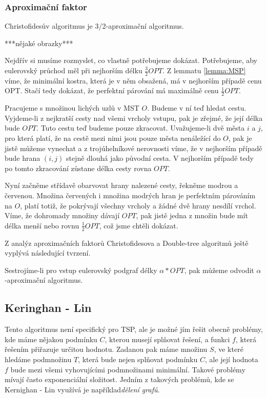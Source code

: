 \documentclass[
  biblatex,
  figures=false,
  glossaries,
  index
]{kidiplom}
\begin{document}
\subsubsection{Aproximační faktor}
\begin{theorem}
	Christofidesův algoritmus  je 3/2-aproximační algoritmus.
\end{theorem}
***nějaké obrazky***

	Nejdřív si musíme rozmyslet, co vlastně potřebujeme dokázat. Potřebujeme, aby eulerovský průchod měl při nejhorším délku $\frac{3}{2}OPT$. Z lemmatu \ref{lemma:MSP} víme, že minimální kostra, která je v něm obsažená, má v nejhorším případě cenu OPT. Stačí tedy dokázat, že perfektní párování má maximálně cenu $\frac{1}{2} OPT$.
	
	Pracujeme s množinou lichých uzlů v MST $O$. Budeme v ní teď hledat cestu. Vyjdeme-li z nejkratší cesty nad všemi vrcholy vstupu, pak je zřejmé, že její délka bude $OPT$. Tuto cestu teď budeme pouze zkracovat. Uvažujeme-li dvě města $i$ a $j$, pro která platí, že na cestě mezi nimi jsou pouze města nenáležící do $O$, pak je jistě můžeme vynechat a z trojúhelníkové nerovnosti víme, že v nejhorším případě bude hrana $(i,j)$ stejně dlouhá jako původní cesta. V nejhorším případě tedy po tomto zkracování zůstane délka cesty rovna $OPT$.
	
	Nyní začněme střídavě obarvovat hrany nalezené cesty, řekněme modrou a červenou. Množina červených i množina modrých hran je perfektním párováním na $O$, platí totiž, že pokrývají všechny vrcholy a žádné dvě hrany nesdílí vrchol. Víme, že dohromady množiny dávají $OPT$, pak jistě jedna z množin bude mít délka menší nebo rovnu $\frac{1}{2}OPT$, což jsme chtěli dokázat.
	
	Z analýz aproximačních faktorů Christofidesova a Double-tree algoritmů ještě vyplývá následující tvrzení.
\begin{lemma}
Sestrojíme-li pro vstup eulerovský podgraf délky $\alpha*OPT$, pak můžeme odvodit $\alpha$-aproximační algoritmus.
\end{lemma}

\begin{example}
\end{example}

\subsection{Keringhan - Lin}

Tento algoritmus není specifický pro TSP, ale je možné jím řešit obecně problémy, kde máme nějakou podmínku $C$, kterou musejí splňovat  řešení, a funkci $f$, která řešením přiřazuje určitou hodnotu. Zadanou pak máme množinu $S$, ve které hledáme podmnožinu $T$, která bude nejen splňovat podmínku $C$, ale její hodnota $f$ bude mezi všemi vyhovujícími podmnožinami minimální. Takové problémy mívají často exponenciální složitost. Jedním z takových problémů, kde se Kernighan - Lin využívá je například\textit{dělení grafů}. 
\end{document}
